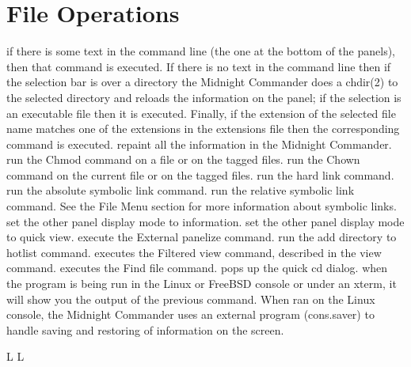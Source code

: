 
\section{File Operations}{}
	{if  there  is  some text in the command line (the one at the
bottom of the panels), then that command is executed. If there is no text in
the command line then if the selection bar is over a directory the Midnight
Commander does a chdir(2) to the selected directory and reloads  the
information  on the panel; if the selection is an executable file then it is
executed. Finally, if the extension of the selected file name matches one of
the extensions in the extensions file then the corresponding command is
executed.}
	{repaint all the information in the Midnight Commander.}
	{run the Chmod command on a file or on the tagged files.}
	{run the Chown command on the current file or on the tagged files.}
	{run the hard link command.}
	{run the absolute symbolic link command.}
	{run the relative symbolic link command. See the File Menu section for more information about symbolic links.}
	{set the other panel display mode to information.}
	{set the other panel display mode to quick view.}
	{execute the External panelize command.}
	{run the add directory to hotlist command.}
\cmdS{\alt !}	{executes the Filtered view command, described in the view command.}
	{executes the Find file command.}
	{pops up the quick cd dialog.}
	{when the program is being run in the Linux or FreeBSD console or under an xterm, it will show you the output of the previous command.   When  ran  on the Linux console, the Midnight Commander uses an external program (cons.saver) to handle saving and restoring of information on the screen.}


\copyrightnotice

\vfil
\supereject
\if L\lr \else\null\vfill\eject\fi
\if L\lr \else\null\vfill\eject\fi
\bye

